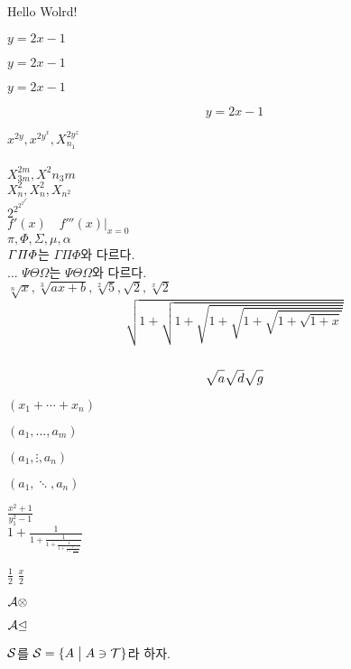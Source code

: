 \documentclass[11pt]{article}
\begin{document}
Hello Wolrd!

$y=2x-1$ 

\(y=2x-1\)

\begin{math}
y=2x-1
\end{math}

$$y=2x-1$$

$x^{2y}, x^{{2y}^x}, X_{n_1}^{2y^z}$ \\ \\

$X^{2m}_{3m}, X^2n_3m$ \\

$X^2_n, X_n^2, X_{n^2}$ \\

$2^{2^{2^{2^{2^{2^{2^{2}}}}}}}$ \\

$f'(x) \quad f'''(x)|_{x=0}$ \\

$\pi, \Phi, \Sigma, \mu, \alpha$ \\

${\mit \Gamma \Pi \Phi}$는 $\Gamma \Pi \Phi$와 다르다. \\

... $\mathit{\Psi \Theta \Omega}$는 $\Psi \Theta \Omega$와 다르다. \\

$\sqrt[n]{x}, \sqrt[3]{ax+b}, \sqrt[2]{5}, \sqrt{2}, \sqrt[x]
{2}$ \\

\begin{equation} \label{eq:sqrt}
\sqrt{1+\sqrt{1+\sqrt{1+\sqrt{1+\sqrt{1+\sqrt{1+x}}}}}}
\end{equation} \\

$$\sqrt{\mathstrut a} \sqrt{\mathstrut d} \sqrt{\mathstrut g}$$

$(x_1+\cdots+x_n)$

$(a_1, \ldots, a_m)$

$(a_1, \vdots, a_n)$

$(a_1, \ddots, a_n)$

$\displaystyle \frac{x^2+1}{y_1^2-1}$ \\

$\displaystyle 1+\frac{1}{1+\frac{1}{1+\frac{1}{1+\frac{1}{1+\frac{1}{1+x}}}}}$

$\frac12$ $\frac x2$

${\cal A} \otimes$

${\cal A} \unlhd$

${\cal S}$를 ${\cal S}=\{A \bigm| A \ni{\cal T}\}$라 하자.
\end{document}
